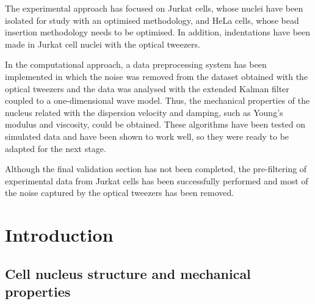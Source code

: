 \documentclass[12pt, a4paper]{article} %
\begin{document}
	The experimental approach has focused on Jurkat cells, whose nuclei have been isolated for study with an optimised methodology, and HeLa cells, whose bead insertion methodology needs to be optimised. In addition, indentations have been made in Jurkat cell nuclei with the optical tweezers.
	
	In the computational approach, a data preprocessing system has been implemented in which the noise was removed from the dataset obtained with the optical tweezers and the data was analysed with the extended Kalman filter coupled to a one-dimensional wave model. Thus, the mechanical properties of the nucleus related with the dispersion velocity and damping, such as Young's modulus and viscosity, could be obtained. These algorithms have been tested on simulated data and have been shown to work well, so they were ready to be adapted for the next stage.
	
	Although the final validation section has not been completed, the pre-filtering of experimental data from Jurkat cells has been successfully performed and most of the noise captured by the optical tweezers has been removed.
	
	\vspace{1cm}
	
	\newpage
	
	
	\tableofcontents
	\setcounter{tocdepth}{2}
	\newpage
	
	\setcounter{page}{1}
	\pagestyle{fancy}
	\lhead{ }
	\renewcommand{\headrulewidth}{0.005pt}
	
	\setlength{\parskip}{0mm}
	
	\section{Introduction}
	
	\subsection{Cell nucleus structure and mechanical properties}
	
\end{document}
